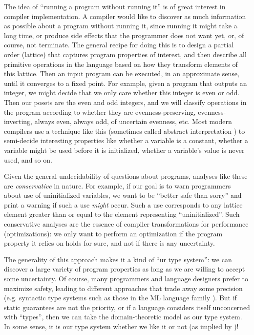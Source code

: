 The idea of ``running a program without running it'' is of great interest
in compiler implementation. A compiler would like to discover as much
information as possible about a program without running it, since
running it might take a long time, or produce side effects that the
programmer does not want yet, or, of course, not terminate.
The general recipe for doing this is to design a partial order (lattice)
that captures program properties of interest, and then describe all
primitive operations in the language based on how they transform
elements of this lattice.
Then an input program can be executed, in an approximate sense, until
it converges to a fixed point.
For example, given a program that outputs an integer, we might decide
that we only care whether this integer is even or odd. Then our posets
are the even and odd integers, and we will classify operations in the
program according to whether they are evenness-preserving,
evenness-inverting, always even, always odd, of uncertain evenness,
etc. %
Most modern compilers use a technique like this
(sometimes called abstract interpretation \cite{abstractinterp})
to semi-decide
interesting properties like whether a variable is a constant, whether
a variable might be used before it is initialized, whether a variable's
value is never used, and so on.

Given the general undecidability of questions about programs, analyses
like these are \emph{conservative} in nature.
For example, if our goal is to warn programmers about use of uninitialized
variables, we want to be ``better safe than sorry'' and print a warning
if such a use \emph{might} occur.
Such a use corresponds to any lattice element greater than or equal to
the element representing ``uninitialized''.
Such conservative analyses are the essence of compiler transformations
for performance (optimizations): we only want to perform an optimization
if the program property it relies on holds for sure, and not if there is
any uncertainty.

The generality of this approach makes it a kind of ``ur type system'':
we can discover a large variety of program properties as long as we are
willing to accept some uncertainty.
Of course, many programmers and language designers prefer to maximize
safety, leading to different approaches that trade away some precision
(e.g. syntactic type systems such as those in the ML language
family \cite{hindley1969principal, MLtypeinf}).
But if static guarantees are not the priority, or if a language considers
itself unconcerned with ``types'', then we can take the domain-theoretic
model as our type system.
In some sense, it is our type system whether we like it or not
(as implied by \cite{scott1976data})!


